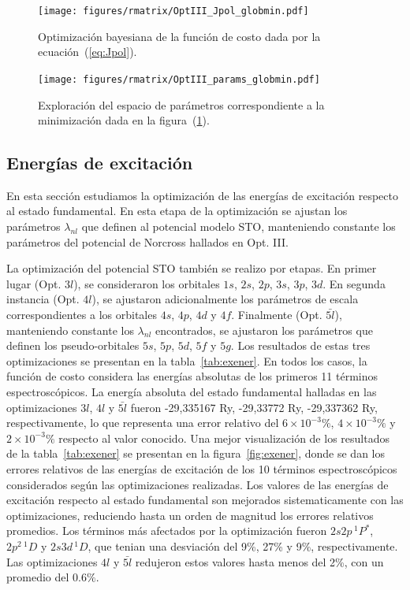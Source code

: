 \begin{figure}[H]
\centering
\texttt{[image: figures/rmatrix/OptIII\_Jpol\_globmin.pdf]}
\caption[Minimización de la función de costo.]
{Optimización bayesiana de la función de costo dada por la 
ecuación~(\ref{eq:Jpol}).}
\label{fig:OptIII-Jpol}
\end{figure}
\begin{figure}[H]
\centering
\texttt{[image: figures/rmatrix/OptIII\_params\_globmin.pdf]}
\caption[Exploración del espacio de parámetros.]
{Exploración del espacio de parámetros correspondiente a la minimización
dada en la figura~(\ref{fig:OptIII-Jpol}).}
\label{fig:OptIII-params}
\end{figure}

\subsection{Energías de excitación}

En esta sección estudiamos la optimización de las energías de excitación 
respecto al estado fundamental. En esta etapa de la optimización se 
ajustan los parámetros $\lambda_{nl}$ que definen al potencial modelo STO, 
manteniendo constante los parámetros del potencial de Norcross hallados
en Opt. III. 

La optimización del potencial STO también se realizo por etapas. En 
primer lugar (Opt. $3l$), se consideraron los orbitales $1s$, $2s$, $2p$, 
$3s$, $3p$, $3d$. En segunda instancia (Opt. $4l$), se ajustaron 
adicionalmente los parámetros de escala correspondientes a los orbitales 
$4s$, $4p$, $4d$ y $4f$. Finalmente (Opt. $\bar{5l}$), manteniendo 
constante los $\lambda_{nl}$ encontrados, se ajustaron los parámetros que 
definen los pseudo-orbitales $5s$, $5p$, $5d$, $5f$ y $5g$. Los 
resultados de estas tres optimizaciones se presentan en la 
tabla~\ref{tab:exener}. En todos los casos, la función de costo considera
las energías absolutas de los primeros 11 términos espectroscópicos. 
La energía absoluta del estado fundamental halladas en las optimizaciones 
$3l$, $4l$ y $\bar{5l}$ fueron -29,335167 Ry, -29,33772 Ry, -29,337362 Ry, 
respectivamente, lo que representa una error relativo del 
$6\times 10^{-3}\%$, $4\times 10^{-3}\%$ y $2\times 10^{-3}\%$ respecto
al valor conocido. Una mejor visualización de los resultados de la 
tabla~\ref{tab:exener} se presentan en la figura~\ref{fig:exener}, donde 
se dan los errores relativos de las energías de excitación de los 10 
términos espectroscópicos considerados según las optimizaciones realizadas.
Los valores de las energías de excitación respecto al estado fundamental
son mejorados sistematicamente con las optimizaciones, reduciendo hasta
un orden de magnitud los errores relativos promedios. Los términos más
afectados por la optimización fueron $2s2p\,^1P^*$, $2p^2\,^1D$ y 
$2s3d\,^1D$, que tenian una desviación del 9\%, 27\% y 9\%, respectivamente.
Las optimizaciones $4l$ y $\bar{5l}$ redujeron estos valores hasta menos 
del 2\%, con un promedio del $0.6\%$. 

